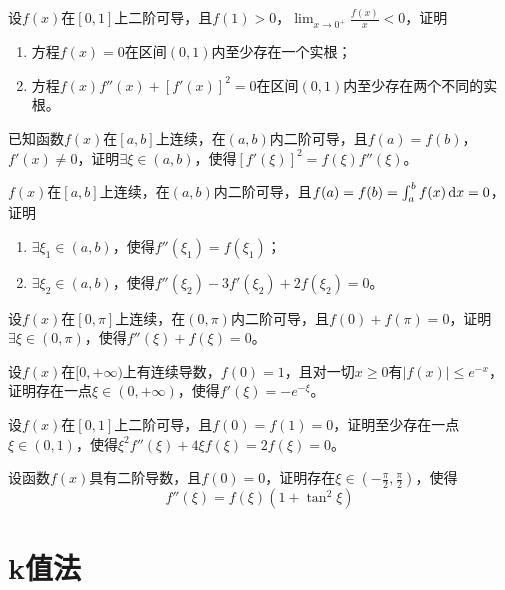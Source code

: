 \begin{example}
	设$f(x)$在$[0,1]$上二阶可导，且$f(1)>0$，$\lim_{x\to 0^+}\frac{f(x)}{x}<0$，证明
	\begin{enumerate}
		\item 方程$f(x)=0$在区间$(0,1)$内至少存在一个实根；
		\item 方程$f(x)f''(x)+[f'(x)]^2=0$在区间$(0,1)$内至少存在两个不同的实根。
	\end{enumerate}
\end{example}

\begin{example}
	已知函数$f(x)$在$[a,b]$上连续，在$(a,b)$内二阶可导，且$f(a)=f(b)$，$f'(x)\neq 0$，证明$\exists\xi\in(a,b)$，使得$[f'(\xi)]^2=f(\xi)f''(\xi)$。
\end{example}

\begin{example}
	$f(x)$在$[a,b]$上连续，在$(a,b)$内二阶可导，且$f(a)=f(b)=\int_{a}^{b}f(x)\,\mathrm{d} x=0$，证明
	\begin{enumerate}
		\item $\exists\xi_1\in(a,b)$，使得$f''(\xi_1)=f(\xi_1)$；
		\item $\exists\xi_2\in(a,b)$，使得$f''(\xi_2)-3f'(\xi_2)+2f(\xi_2)=0$。
	\end{enumerate}
\end{example}

\begin{example}
	设$f(x)$在$[0,\pi]$上连续，在$(0,\pi)$内二阶可导，且$f(0)+f(\pi)=0$，证明$\exists\xi\in(0,\pi)$，使得$f''(\xi)+f(\xi)=0$。
\end{example}

\begin{example}
	设$f(x)$在$[0,+\infty)$上有连续导数，$f(0)=1$，且对一切$x\geqslant0$有$|f(x)|\leqslant e^{-x}$，证明存在一点$\xi\in(0,+\infty)$，使得$f'(\xi)=-e^{-\xi}$。
\end{example}

\begin{example}
	设$f(x)$在$[0,1]$上二阶可导，且$f(0)=f(1)=0$，证明至少存在一点$\xi\in(0,1)$，使得$\xi^2f''(\xi)+4\xi f(\xi)=2f(\xi)=0$。
\end{example}

\begin{example}
	设函数$f(x)$具有二阶导数，且$f(0)=0$，证明存在$\xi\in\left(-\frac{\pi}{2},\frac{\pi}{2}\right)$，使得\[f''(\xi)=f(\xi)(1+\tan^2\xi)\]
\end{example}

\section{k值法}

